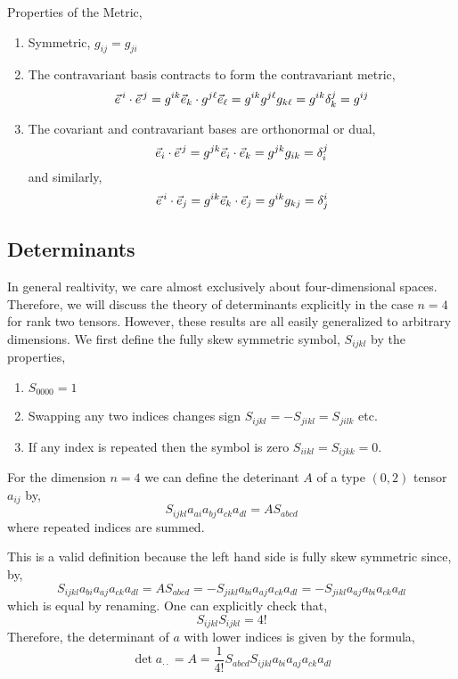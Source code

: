 \documentclass[11pt, a4paper]{article}
\begin{document}
\begin{theorem}
Properties of the Metric,
\begin{enumerate}
\item Symmetric, $g_{ij} = g_{ji}$

\item The contravariant basis contracts to form the contravariant metric, 
\[\vec{e}^{\, i} \cdot \vec{e}^{\, j} = g^{ik} \vec{e}_k \cdot g^{j \ell} \vec{e}_{\ell} = g^{ik} g^{j \ell} g_{k \ell} = g^{ik} \delta^j_k  = g^{ij}\]

\item The covariant and contravariant bases are orthonormal or dual,
\[ \vec{e}_i \cdot \vec{e}^{\, j} = g^{jk} \vec{e}_i \cdot \vec{e}_k = g^{jk} g_{ik} = \delta^j_i \]
and similarly,
\[ \vec{e}^{\, i} \cdot \vec{e}_j = g^{ik} \vec{e}_k \cdot \vec{e}_j = g^{ik} g_{kj} = \delta^i_j \]
\end{enumerate}
\end{theorem}

\subsection{Determinants}

In general realtivity, we care almost exclusively about four-dimensional spaces. Therefore, we will discuss the theory of determinants explicitly in the case $n = 4$ for rank two tensors. However, these results are all easily generalized to arbitrary dimensions.
We first define the fully skew symmetric symbol, $S_{ijkl}$ by the properties,
\begin{enumerate}
\item $S_{0000} = 1$
\item Swapping any two indices changes sign $S_{ijkl} = - S_{jikl} = S_{jilk}$ etc.
\item If any index is repeated then the symbol is zero $S_{iikl} = S_{ijkk} = 0$.
\end{enumerate}

\begin{definition}
For the dimension $n = 4$ we can define the deterinant $A$ of a type $(0, 2)$ tensor $a_{ij}$ by,
\[ S_{ijkl} a_{ai} a_{bj} a_{ck} a_{dl} = A S_{abcd}\]
where repeated indices are summed. 
\end{definition}
This is a valid definition because the left hand side is fully skew symmetric since,
by,
\[ S_{ijkl} a_{bi} a_{aj} a_{ck} a_{dl} = A S_{abcd} = - S_{jikl} a_{bi} a_{aj} a_{ck} a_{dl} = -  S_{jikl} a_{aj} a_{bi}  a_{ck} a_{dl} \]
which is equal by renaming. One can explicitly check that,
\[ S_{ijkl} S_{ijkl} = 4! \]
Therefore, the determinant of $a$ with lower indices is given by the formula,
\[ \det{a_{\cdot \cdot}} = A = \frac{1}{4!} S_{abcd} S_{ijkl} a_{bi} a_{aj} a_{ck} a_{dl}\]
\end{document}
